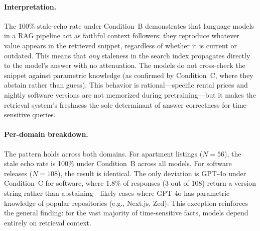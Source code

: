 \paragraph{Interpretation.}
The 100\% stale-echo rate under Condition~B demonstrates that language models
in a RAG pipeline act as faithful context followers: they reproduce whatever value
appears in the retrieved snippet, regardless of whether it is current or outdated.
This means that \emph{any} staleness in the search index propagates directly to
the model's answer with no attenuation. The models do not cross-check the snippet
against parametric knowledge (as confirmed by Condition~C, where they abstain
rather than guess). This behavior is rational---specific rental prices and nightly
software versions are not memorized during pretraining---but it makes the retrieval
system's freshness the sole determinant of answer correctness for time-sensitive
queries.

\paragraph{Per-domain breakdown.}
The pattern holds across both domains. For apartment listings ($N = 56$), the stale
echo rate is 100\% under Condition~B across all models. For software releases
($N = 108$), the result is identical. The only deviation is GPT-4o under Condition~C
for software, where 1.8\% of responses (3 out of 108) return a version string
rather than abstaining---likely cases where GPT-4o has parametric knowledge of
popular repositories (e.g., Next.js, Zed). This exception reinforces the general
finding: for the vast majority of time-sensitive facts, models depend entirely on
retrieval context.
